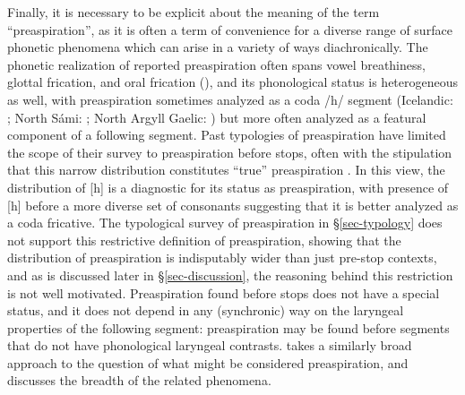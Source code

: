 \documentclass[output=paper,colorlinks,citecolor=brown]{langscibook}
\begin{document}
Finally, it is necessary to be explicit about the meaning of the term ``preaspiration'', as it is often a term of convenience for a diverse range of surface phonetic phenomena which can arise in a variety of ways diachronically. The phonetic realization of reported preaspiration often spans vowel breathiness, glottal frication, and oral frication (\citealt{Silverman2003,hejna2016,chapters/16_Hejná}), and its phonological status is heterogeneous as well, with preaspiration sometimes analyzed as a coda /h/ segment (Icelandic: \citealp{arnason2011}; North Sámi: \citealp{balsbaal2012}; North Argyll Gaelic: \citealp{iosadetal2015}) but more often analyzed as a featural component of a following segment. Past typologies of preaspiration have limited the scope of their survey to preaspiration before stops, often with the stipulation that this narrow distribution constitutes ``true'' preaspiration \citep{Helgason2002,Silverman2003,Clayton:2010}. In this view, the distribution of [h] is a diagnostic for its status as preaspiration, with presence of [h] before a more diverse set of consonants suggesting that it is better analyzed as a coda fricative. The typological survey of preaspiration in \S\ref{sec-typology} does not support this restrictive definition of preaspiration, showing that the distribution of preaspiration is indisputably wider than just pre-stop contexts, and as is discussed later in \S\ref{sec-discussion}, the reasoning behind this restriction is not well motivated. Preaspiration found before stops does not have a special status, and it does not depend in any (synchronic) way on the laryngeal properties of the following segment: preaspiration may be found before segments that do not have phonological laryngeal contrasts.  takes a similarly broad approach to the question of what might be considered preaspiration, and discusses the breadth of the related phenomena.  %
\end{document}
